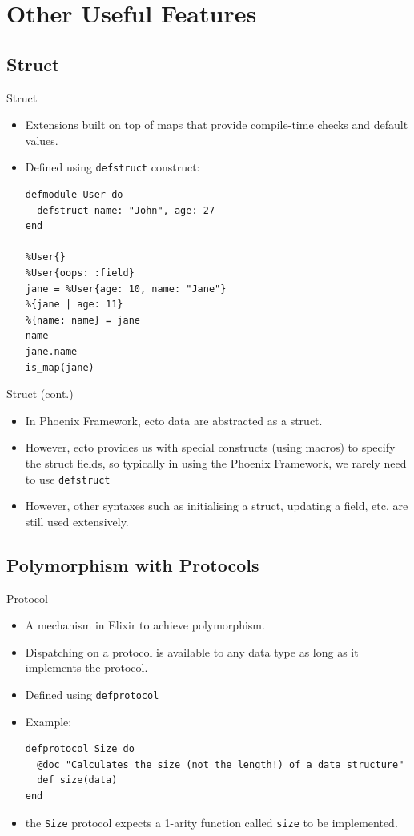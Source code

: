 \documentclass[12pt]{beamer}
\begin{document}
\section{Other Useful Features}
\subsection{Struct}
\begin{frame}[fragile]{Struct}
  \begin{itemize}
    \item Extensions built on top of maps that provide compile-time checks and default values.
    \item Defined using \texttt{defstruct} construct:
          \begin{verbatim}
defmodule User do
  defstruct name: "John", age: 27
end

%User{}
%User{oops: :field}
jane = %User{age: 10, name: "Jane"}
%{jane | age: 11}
%{name: name} = jane
name
jane.name
is_map(jane)
  \end{verbatim}
  \end{itemize}
\end{frame}

\begin{frame}{Struct (cont.)}
  \begin{itemize}
    \item In Phoenix Framework, ecto data are abstracted as a struct.
    \item However, ecto provides us with special constructs (using macros) to specify the struct fields, so typically in using the Phoenix Framework, we rarely need to use \texttt{defstruct}
    \item However, other syntaxes such as initialising a struct, updating a field, etc. are still used extensively.
  \end{itemize}
\end{frame}

\subsection{Polymorphism with Protocols}
\begin{frame}[fragile]{Protocol}
  \begin{itemize}
    \item A mechanism in Elixir to achieve polymorphism.
    \item Dispatching on a protocol is available to any data type as long as it implements the protocol.
    \item Defined using \texttt{defprotocol}
    \item Example:
          \begin{verbatim}
defprotocol Size do
  @doc "Calculates the size (not the length!) of a data structure"
  def size(data)
end
  \end{verbatim}
    \item the \texttt{Size} protocol expects a 1-arity function called \texttt{size} to be implemented.
  \end{itemize}
\end{frame}
\end{document}
